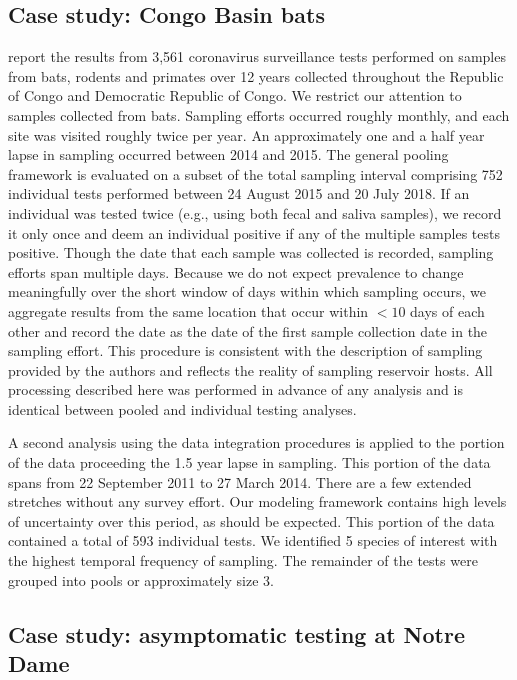 \documentclass{article}
\begin{document}
\subsection{Case study: Congo Basin bats}
\cite{kumakamba2021coronavirus} report the results from 3,561 coronavirus surveillance tests performed on samples from bats, rodents and primates over 12 years collected throughout the Republic of Congo and Democratic Republic of Congo. We restrict our attention to samples collected from bats. Sampling efforts occurred roughly monthly, and each site was visited roughly twice per year. An approximately one and a half year lapse in sampling occurred between 2014 and 2015. The general pooling framework is evaluated on a subset of the total sampling interval comprising 752 individual tests performed between 24 August 2015 and 20 July 2018. If an individual was tested twice (e.g., using both fecal and saliva samples), we record it only once and deem an individual positive if any of the multiple samples tests positive. Though the date that each sample was collected is recorded, sampling efforts span multiple days. Because we do not expect prevalence to change meaningfully over the short window of days within which sampling occurs, we aggregate results from the same location that occur within $<10$ days of each other and record the date as the date of the first sample collection date in the sampling effort. This procedure is consistent with the description of sampling provided by the authors and reflects the reality of sampling reservoir hosts. All processing described here was performed in advance of any analysis and is identical between pooled and individual testing analyses.

A second analysis using the data integration procedures is applied to the portion of the data proceeding the 1.5 year lapse in sampling. This portion of the data spans from 22 September 2011 to 27 March 2014. There are a few extended stretches without any survey effort. Our modeling framework contains high levels of uncertainty over this period, as should be expected. This portion of the data contained a total of 593 individual tests. We identified 5 species of interest with the highest temporal frequency of sampling. The remainder of the tests were grouped into pools or approximately size 3. 

\subsection{Case study: asymptomatic testing at Notre Dame}
\end{document}
